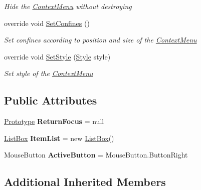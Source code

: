 \begin{DoxyCompactItemize}
\begin{DoxyCompactList}\small\item\em Hide the \mbox{\hyperlink{class_space_v_i_l_1_1_context_menu}{Context\+Menu}} without destroying \end{DoxyCompactList}\item 
override void \mbox{\hyperlink{class_space_v_i_l_1_1_context_menu_ae8eaad3b3f7858ab1d03f5a18d94e4ca}{Set\+Confines}} ()
\begin{DoxyCompactList}\small\item\em Set confines according to position and size of the \mbox{\hyperlink{class_space_v_i_l_1_1_context_menu}{Context\+Menu}} \end{DoxyCompactList}\item 
override void \mbox{\hyperlink{class_space_v_i_l_1_1_context_menu_a92517e2e7ef73ccdadfa5b4016af403b}{Set\+Style}} (\mbox{\hyperlink{class_space_v_i_l_1_1_decorations_1_1_style}{Style}} style)
\begin{DoxyCompactList}\small\item\em Set style of the \mbox{\hyperlink{class_space_v_i_l_1_1_context_menu}{Context\+Menu}} \end{DoxyCompactList}\end{DoxyCompactItemize}
\subsection*{Public Attributes}
\begin{DoxyCompactItemize}
\item 
\mbox{\label{class_space_v_i_l_1_1_context_menu_a2efee828c3568567902379c4e7c052e0}} 
\mbox{\hyperlink{class_space_v_i_l_1_1_prototype}{Prototype}} {\bfseries Return\+Focus} = null
\item 
\mbox{\label{class_space_v_i_l_1_1_context_menu_ab8a30424e07f90b2785003f0116d2563}} 
\mbox{\hyperlink{class_space_v_i_l_1_1_list_box}{List\+Box}} {\bfseries Item\+List} = new \mbox{\hyperlink{class_space_v_i_l_1_1_list_box}{List\+Box}}()
\item 
\mbox{\label{class_space_v_i_l_1_1_context_menu_ae2ff11e63ae6a6103872a7cb50b27e29}} 
Mouse\+Button {\bfseries Active\+Button} = Mouse\+Button.\+Button\+Right
\end{DoxyCompactItemize}
\subsection*{Additional Inherited Members}



